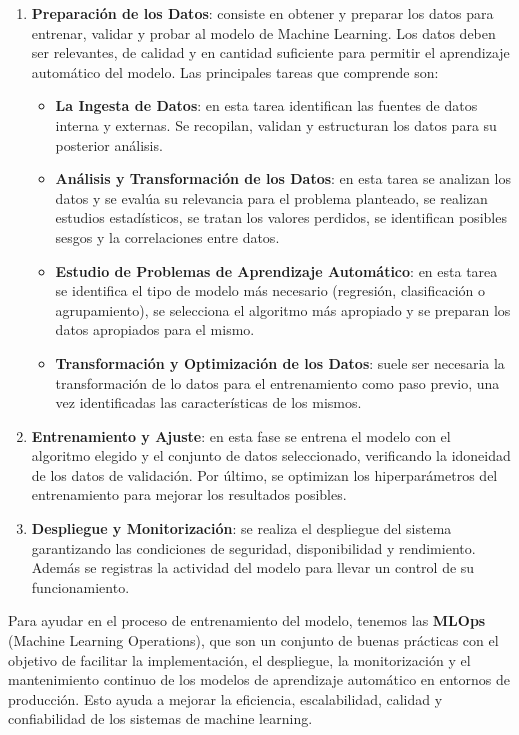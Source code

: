\begin{enumerate}
	\item \textbf{Preparación de los Datos}: consiste en obtener y preparar los datos para entrenar, validar y probar al modelo de Machine Learning. Los datos deben ser relevantes, de calidad y en cantidad suficiente para permitir el aprendizaje automático del modelo. Las principales tareas que comprende son:
	\begin{itemize}
		\item \textbf{La Ingesta de Datos}: en esta tarea identifican las fuentes de datos interna y externas. Se recopilan, validan y estructuran los datos para su posterior análisis.
		\item \textbf{Análisis y Transformación de los Datos}: en esta tarea se analizan los datos y se evalúa su relevancia para el problema planteado, se realizan estudios estadísticos, se tratan los valores perdidos, se identifican posibles \gls{sesgos} y la correlaciones entre datos.
		\item \textbf{Estudio de Problemas de Aprendizaje Automático}: en esta tarea se identifica el tipo de modelo más necesario (regresión, clasificación o agrupamiento), se selecciona el algoritmo más apropiado y se preparan los datos apropiados para el mismo. 
		\item \textbf{Transformación y Optimización de los Datos}: suele ser necesaria la transformación de lo datos para el entrenamiento como paso previo, una vez identificadas las características de los mismos.
	\end{itemize}
	
	\item \textbf{Entrenamiento y Ajuste}: en esta fase se entrena el modelo con el algoritmo elegido y el conjunto de datos seleccionado, verificando la idoneidad de los datos de validación. Por último, se optimizan los hiperparámetros del entrenamiento para mejorar los resultados posibles. 
	
	\item \textbf{Despliegue y Monitorización}: se realiza el despliegue del sistema garantizando las condiciones de seguridad, disponibilidad y rendimiento. Además se registras la actividad del modelo para llevar un control de su funcionamiento.
\end{enumerate}

Para ayudar en el proceso de entrenamiento del modelo, tenemos las \textbf{MLOps} (Machine Learning Operations), que son un conjunto de buenas prácticas con el objetivo de facilitar la implementación, el despliegue, la monitorización y el mantenimiento continuo de los modelos de aprendizaje automático en entornos de producción. Esto ayuda a mejorar la eficiencia, escalabilidad, calidad y confiabilidad de los sistemas de machine learning. \cite{aws01}

